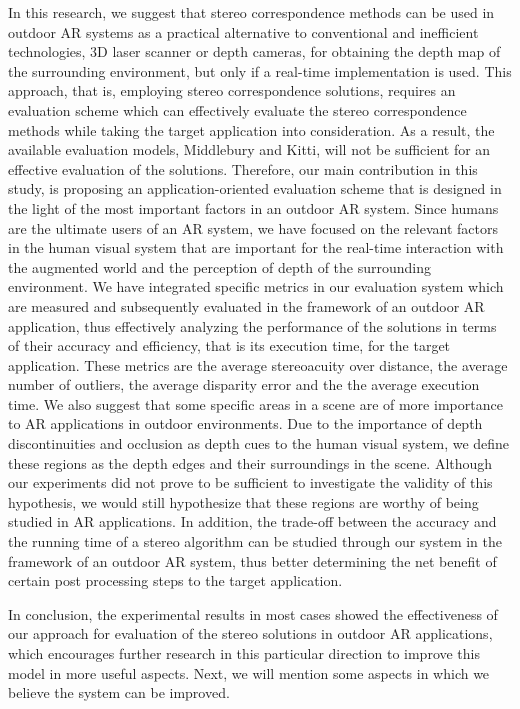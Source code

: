 In this research, we suggest that stereo correspondence methods can be used in outdoor AR systems
as a practical alternative to conventional and inefficient technologies, 3D laser scanner or depth cameras, for obtaining the depth map 
of the surrounding environment, but only if a real-time implementation is used.
This approach, that is, employing stereo correspondence solutions, requires an evaluation scheme which can effectively evaluate the stereo correspondence methods 
while taking the target application into consideration. As a result, the available
evaluation models, Middlebury and Kitti, will not be sufficient for an effective evaluation of the solutions.
Therefore, our main contribution in this study, is proposing an application-oriented evaluation scheme that is designed in the light of the most important
factors in an outdoor AR system. Since humans are the ultimate users of an AR system, we have focused on the relevant factors in the human visual system
that are important for the real-time interaction with the augmented world and the perception of depth of the surrounding environment. We have integrated
specific metrics in our evaluation system which are measured and subsequently evaluated in the framework of an outdoor AR application, thus effectively
analyzing the performance of the solutions in terms of their accuracy and efficiency, that is its execution time, for the target application. These metrics are
the average stereoacuity over distance, the average number of outliers, the average disparity error and the the average execution time. We also suggest that some specific areas 
in a scene are of more importance to AR applications in outdoor environments. Due to the importance of depth discontinuities and occlusion as depth cues to the human visual system,
we define these regions as the depth edges and their surroundings in the scene. Although our experiments did not prove to be sufficient to investigate the validity of this hypothesis,
we would still hypothesize that these regions are worthy of being studied in AR applications.
In addition, the trade-off between the accuracy and the running time of a stereo algorithm can be studied through our system in the framework of an outdoor AR system, thus
better determining the net benefit of certain post processing steps to the target application.

In conclusion, the experimental results in most cases showed the effectiveness of our approach for evaluation of the stereo solutions in outdoor AR applications, which encourages
further research in this particular direction to improve this model in more useful aspects.
Next, we will mention some aspects in which we believe the system can be improved.

